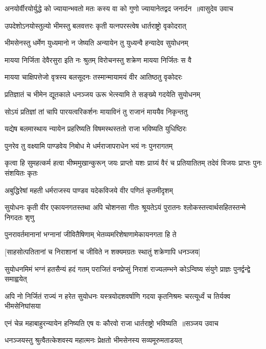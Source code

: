 \threelineshloka
{अनयोर्वीरयोर्युद्धे को ज्यायान्भवतो मतः}
{कस्य वा को गुणो ज्यायानेतद्वद जनार्दन ॥वासुदेव उवाच}
{}


\twolineshloka
{उपदेशोऽनयोस्तुल्यो भीमस्तु बलवत्तरः}
{कृती यत्नपरस्त्वेष धार्तराष्ट्रो वृकोदरात्}


\twolineshloka
{भीमसेनस्तु धर्मेण युध्यमानो न जेष्यति}
{अन्यायेन तु युध्यन्वै हन्यादेव सुयोधनम्}


\twolineshloka
{मायया निर्जिता देवैरसुरा इति नः श्रुतम्}
{विरोचनस्तु शक्रेण मायया निर्जितः स वै}


\twolineshloka
{मायया चाक्षिपत्तेजो वृत्रस्य बलसूदनः}
{तस्मान्मायामयं वीर आतिष्ठतु वृकोदरः}


\twolineshloka
{प्रतिज्ञातं च भीमेन द्यूतकाले धनञ्जय}
{ऊरू भेत्स्यामि ते सङ्ख्ये गदयेति सुयोधनम्}


\twolineshloka
{सोऽयं प्रतिज्ञां तां चापि पारयत्वरिकर्शनः}
{मायाविनं तु राजानं माययैव निकृन्ततु}


\twolineshloka
{यद्येष बलमास्थाय न्यायेन प्रहरिष्यति}
{विषमस्थस्ततो राजा भविष्यति युधिष्ठिरः}


\twolineshloka
{पुनरेव तु वक्ष्यामि पाण्डवेय निबोध मे}
{धर्मराजापराधेन भयं नः पुनरागतम्}


\threelineshloka
{कृत्वा हि सुमहत्कर्म हत्वा भीष्ममुखान्कुरून्}
{जयः प्राप्तो यशः प्राग्र्यं वैरं च प्रतियातितम्}
{तदेवं विजयः प्राप्तः पुनः संशयितः कृतः}


\twolineshloka
{अबुद्धिरेषां महती धर्मराजस्य पाण्डव}
{यदेकविजये वीर पणितं कृतमीदृशम्}


सुयोधनः कृती वीर एकायनगतस्तथा
\twolineshloka
{अपि चोशनसा गीतः श्रूयतेऽयं पुरातनः}
{श्लोकस्तत्त्वार्थसहितस्तन्मे निगदतः शृणु}


\twolineshloka
{पुनरावर्तमानानां भग्नानां जीवितैषिणाम्}
{भेतव्यमरिशेषाणामेकायनगता हि ते}


\twolineshloka
{[साहसोत्पतितानां च निराशानां च जीविते}
{न शक्यमग्रतः स्थातुं शक्रेणापि धनञ्जय]}


\threelineshloka
{सुयोधनमिमं भग्नं हतसैन्यं हदं गतम्}
{पराजितं वनप्रेप्सुं निराशं राज्यलम्भने}
{कोऽन्विष्य संयुगे प्राज्ञः पुनर्द्वन्द्वे समाह्वयेत्}


\threelineshloka
{अपि नो निर्जितं राज्यं न हरेत सुयोधनः}
{यस्त्रयोदशवर्षाणि गदया कृतनिश्रमः}
{चरत्यूर्ध्वं च तिर्यक्व भीमसेनिघांसया}


\threelineshloka
{एनं चेन्न महाबाहुरन्यायेन हनिष्यति}
{एष वः कौरवो राजा धार्तराष्ट्रो भविष्यति ॥सञ्जय उवाच}
{}


\twolineshloka
{धनञ्जयस्तु श्रुत्वैतत्केशवस्य महात्मनः}
{प्रेक्षतो भीमसेनस्य सव्यमूरुमताडयत्}


